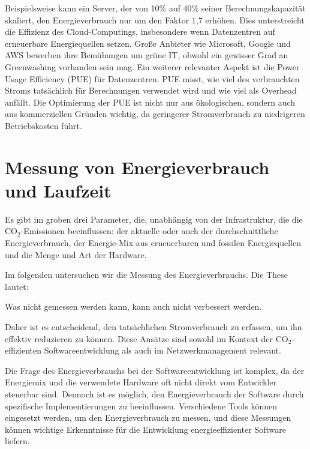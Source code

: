\documentclass{article}
\begin{document}
Beispielsweise kann ein Server, der von 10\% auf 40\% seiner Berechnungskapazität skaliert, den Energieverbrauch nur um den Faktor 1,7 erhöhen. Dies unterstreicht die Effizienz des Cloud-Computings, insbesondere wenn Datenzentren auf erneuerbare Energiequellen setzen. Große Anbieter wie Microsoft, Google und AWS bewerben ihre Bemühungen um grüne IT, obwohl ein gewisser Grad an Greenwashing vorhanden sein mag. 
Ein weiterer relevanter Aspekt ist die Power Usage Efficiency (PUE) für Datenzentren. PUE misst, wie viel des verbrauchten Stroms tatsächlich für Berechnungen verwendet wird und wie viel als Overhead anfällt. Die Optimierung der PUE ist nicht nur aus ökologischen, sondern auch aus kommerziellen Gründen wichtig, da geringerer Stromverbrauch zu niedrigeren Betriebskosten führt.


\section{Messung von Energieverbrauch und Laufzeit}

Es gibt im groben drei Parameter, die, unabhängig von der Infrastruktur, die die CO$_2$-Emissionen beeinflussen:
der aktuelle oder auch der durchschnittliche  Energieverbrauch, der  Energie-Mix aus erneuerbaren und fossilen Energiequellen und die Menge und Art der Hardware.

Im folgenden untersuchen wir die Messung des Energieverbrauchs. Die These lautet: 
\begin{center}
Was nicht gemessen werden kann, kann auch nicht verbessert werden. 
\end{center}
Daher ist es entscheidend, den tatsächlichen Stromverbrauch zu erfassen, um ihn effektiv reduzieren zu können. Diese Ansätze sind sowohl im Kontext der CO$_2$-effizienten Softwareentwicklung als auch im Netzwerkmanagement relevant.

Die Frage des Energieverbrauchs bei der Softwareentwicklung ist komplex, da der Energiemix und die verwendete Hardware oft nicht direkt vom Entwickler steuerbar sind. Dennoch ist es möglich, den Energieverbrauch der Software durch spezifische Implementierungen zu beeinflussen. Verschiedene Tools können eingesetzt werden, um den Energieverbrauch zu messen, und diese Messungen können wichtige Erkenntnisse für die Entwicklung energieeffizienter Software liefern.
\end{document}
